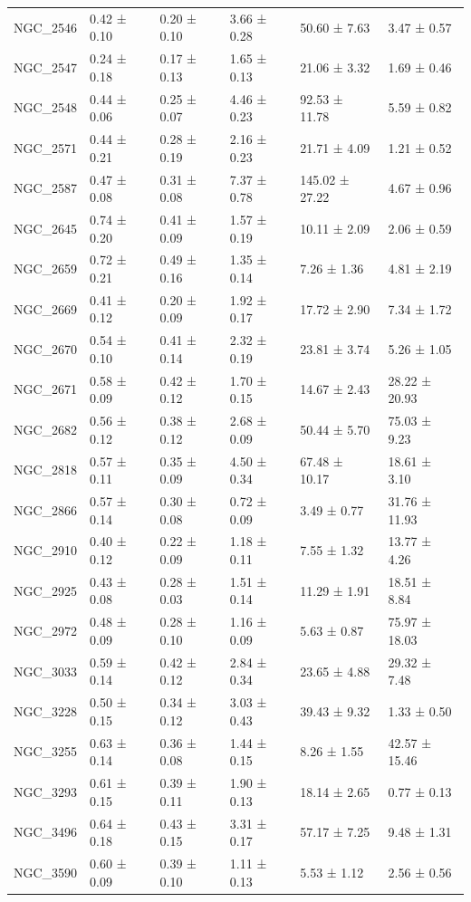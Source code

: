 \begin{tabular}{llllll}
NGC_2546 & 0.42 ± 0.10 & 0.20 ± 0.10 & 3.66 ± 0.28 & 50.60 ± 7.63 & 3.47 ± 0.57 \\
NGC_2547 & 0.24 ± 0.18 & 0.17 ± 0.13 & 1.65 ± 0.13 & 21.06 ± 3.32 & 1.69 ± 0.46 \\
NGC_2548 & 0.44 ± 0.06 & 0.25 ± 0.07 & 4.46 ± 0.23 & 92.53 ± 11.78 & 5.59 ± 0.82 \\
NGC_2571 & 0.44 ± 0.21 & 0.28 ± 0.19 & 2.16 ± 0.23 & 21.71 ± 4.09 & 1.21 ± 0.52 \\
NGC_2587 & 0.47 ± 0.08 & 0.31 ± 0.08 & 7.37 ± 0.78 & 145.02 ± 27.22 & 4.67 ± 0.96 \\
NGC_2645 & 0.74 ± 0.20 & 0.41 ± 0.09 & 1.57 ± 0.19 & 10.11 ± 2.09 & 2.06 ± 0.59 \\
NGC_2659 & 0.72 ± 0.21 & 0.49 ± 0.16 & 1.35 ± 0.14 & 7.26 ± 1.36 & 4.81 ± 2.19 \\
NGC_2669 & 0.41 ± 0.12 & 0.20 ± 0.09 & 1.92 ± 0.17 & 17.72 ± 2.90 & 7.34 ± 1.72 \\
NGC_2670 & 0.54 ± 0.10 & 0.41 ± 0.14 & 2.32 ± 0.19 & 23.81 ± 3.74 & 5.26 ± 1.05 \\
NGC_2671 & 0.58 ± 0.09 & 0.42 ± 0.12 & 1.70 ± 0.15 & 14.67 ± 2.43 & 28.22 ± 20.93 \\
NGC_2682 & 0.56 ± 0.12 & 0.38 ± 0.12 & 2.68 ± 0.09 & 50.44 ± 5.70 & 75.03 ± 9.23 \\
NGC_2818 & 0.57 ± 0.11 & 0.35 ± 0.09 & 4.50 ± 0.34 & 67.48 ± 10.17 & 18.61 ± 3.10 \\
NGC_2866 & 0.57 ± 0.14 & 0.30 ± 0.08 & 0.72 ± 0.09 & 3.49 ± 0.77 & 31.76 ± 11.93 \\
NGC_2910 & 0.40 ± 0.12 & 0.22 ± 0.09 & 1.18 ± 0.11 & 7.55 ± 1.32 & 13.77 ± 4.26 \\
NGC_2925 & 0.43 ± 0.08 & 0.28 ± 0.03 & 1.51 ± 0.14 & 11.29 ± 1.91 & 18.51 ± 8.84 \\
NGC_2972 & 0.48 ± 0.09 & 0.28 ± 0.10 & 1.16 ± 0.09 & 5.63 ± 0.87 & 75.97 ± 18.03 \\
NGC_3033 & 0.59 ± 0.14 & 0.42 ± 0.12 & 2.84 ± 0.34 & 23.65 ± 4.88 & 29.32 ± 7.48 \\
NGC_3228 & 0.50 ± 0.15 & 0.34 ± 0.12 & 3.03 ± 0.43 & 39.43 ± 9.32 & 1.33 ± 0.50 \\
NGC_3255 & 0.63 ± 0.14 & 0.36 ± 0.08 & 1.44 ± 0.15 & 8.26 ± 1.55 & 42.57 ± 15.46 \\
NGC_3293 & 0.61 ± 0.15 & 0.39 ± 0.11 & 1.90 ± 0.13 & 18.14 ± 2.65 & 0.77 ± 0.13 \\
NGC_3496 & 0.64 ± 0.18 & 0.43 ± 0.15 & 3.31 ± 0.17 & 57.17 ± 7.25 & 9.48 ± 1.31 \\
NGC_3590 & 0.60 ± 0.09 & 0.39 ± 0.10 & 1.11 ± 0.13 & 5.53 ± 1.12 & 2.56 ± 0.56 \\

\end{tabular}
